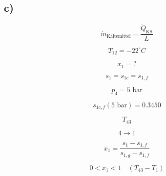 

\subsection*{c)}

\[
\dot{m}_{\text{Kältemittel}} = \frac{\dot{Q}_{\text{KS}}}{L}
\]

\[
T_{12} = -22^\circ C
\]

\[
x_1 = ?
\]

\[
s_1 = s_{1c} = s_{1,f}
\]

\[
p_4 = 5 \text{ bar}
\]

\[
s_{1c,f} (5 \text{ bar}) = 0.3450
\]

\[
T_{43}
\]

\[
4 \rightarrow 1
\]

\[
x_1 = \frac{s_1 - s_{1,f}}{s_{1,g} - s_{1,f}}
\]

\[
0 < x_1 < 1 \quad (T_{43} - T_{1})
\]